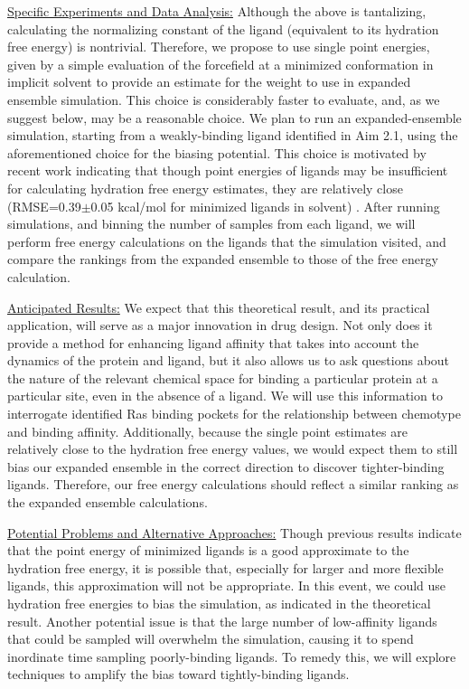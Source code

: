 \documentclass[12pt]{article}
\begin{document}
\underline{Specific Experiments and Data Analysis:}  Although the above is tantalizing, calculating the normalizing constant of the ligand (equivalent to its hydration free energy) is nontrivial. Therefore, we propose to use single point energies, given by a simple evaluation of the forcefield at a minimized conformation in implicit solvent to provide an estimate for the weight to use in expanded ensemble simulation. This choice is considerably faster to evaluate, and, as we suggest below, may be a reasonable choice. We plan to run an expanded-ensemble simulation, starting from a weakly-binding ligand identified in Aim 2.1, using the aforementioned choice for the biasing potential. This choice is motivated by recent work \cite{mobley2008} indicating that though point energies of ligands may be insufficient for calculating hydration free energy estimates, they are relatively close (RMSE=0.39$\pm$0.05 kcal/mol for minimized ligands in solvent) \cite{mobley2008}. After running simulations, and binning the number of samples from each ligand, we will perform free energy calculations on the ligands that the simulation visited, and compare the rankings from the expanded ensemble to those of the free energy calculation.

\underline{Anticipated Results:} We expect that this theoretical result, and its practical application, will serve as a major innovation in drug design. Not only does it provide a method for enhancing ligand affinity that takes into account the dynamics of the protein and ligand, but it also allows us to ask questions about the nature of the relevant chemical space for binding a particular protein at a particular site, even in the absence of a ligand. We will use this information to interrogate identified Ras binding pockets for the relationship between chemotype and binding affinity. Additionally, because the single point estimates are relatively close to the hydration free energy values, we would expect them to still bias our expanded ensemble in the correct direction to discover tighter-binding ligands. Therefore, our free energy calculations should reflect a similar ranking as the expanded ensemble calculations. 

\underline{Potential Problems and Alternative Approaches:} Though previous results indicate that the point energy of minimized ligands is a good approximate to the hydration free energy, it is possible that, especially for larger and more flexible ligands, this approximation will not be appropriate. In this event, we could use hydration free energies to bias the simulation, as indicated in the theoretical result. Another potential issue is that the large number of low-affinity ligands that could be sampled will overwhelm the simulation, causing it to spend inordinate time sampling poorly-binding ligands. To remedy this, we will explore techniques to amplify the bias toward tightly-binding ligands.
\end{document}

